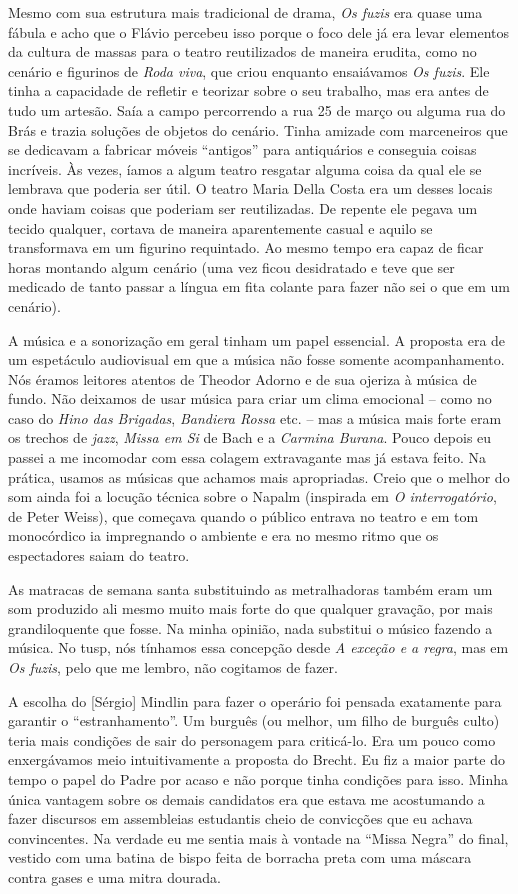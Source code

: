 Mesmo com sua estrutura mais tradicional de drama, {\it Os fuzis} era
quase uma fábula e acho que o Flávio percebeu isso porque o foco dele já
era levar elementos da cultura de massas para o teatro reutilizados de
maneira erudita, como no cenário e figurinos de {\it Roda viva}, que
criou enquanto ensaiávamos {\it Os fuzis}. Ele tinha a capacidade de
refletir e teorizar sobre o seu trabalho, mas era antes de tudo um
artesão. Saía a campo percorrendo a rua 25 de março ou alguma rua do
Brás e trazia soluções de objetos do cenário. Tinha amizade com
marceneiros que se dedicavam a fabricar móveis “antigos” para
antiquários e conseguia coisas incríveis. Às vezes, íamos a algum teatro
resgatar alguma coisa da qual ele se lembrava que poderia ser útil. O
teatro Maria Della Costa era um desses locais onde haviam coisas que
poderiam ser reutilizadas. De repente ele pegava um tecido qualquer,
cortava de maneira aparentemente casual e aquilo se transformava em um
figurino requintado. Ao mesmo tempo era capaz de ficar horas montando
algum cenário (uma vez ficou desidratado e teve que ser medicado de
tanto passar a língua em fita colante para fazer não sei o que em um
cenário).

A música e a sonorização em geral tinham um papel essencial. A proposta
era de um espetáculo audiovisual em que a música não fosse somente
acompanhamento. Nós éramos leitores atentos de Theodor Adorno e de sua
ojeriza à música de fundo. Não deixamos de usar música para criar um
clima emocional -- como no caso do {\it Hino das Brigadas},
{\it Bandiera Rossa} etc. -- mas a música mais forte eram os trechos de
{\it jazz}, {\it Missa em Si} de Bach e a {\it Carmina Burana}. Pouco
depois eu passei a me incomodar com essa colagem extravagante mas já
estava feito. Na prática, usamos as músicas que achamos mais
apropriadas. Creio que o melhor do som ainda foi a locução técnica sobre
o Napalm (inspirada em {\it O interrogatório}, de Peter Weiss), que
começava quando o público entrava no teatro e em tom monocórdico ia
impregnando o ambiente e era no mesmo ritmo que os espectadores saiam do
teatro.

As matracas de semana santa substituindo as metralhadoras também eram um
som produzido ali mesmo muito mais forte do que qualquer gravação, por
mais grandiloquente que fosse. Na minha opinião, nada substitui o músico
fazendo a música. No {\sc tusp}, nós tínhamos essa concepção desde {\it A
exceção e a regra}, mas em {\it Os fuzis}, pelo que me lembro, não
cogitamos de fazer.

A escolha do {[}Sérgio{]} Mindlin para fazer o operário foi pensada
exatamente para garantir o “estranhamento”. Um burguês (ou melhor, um
filho de burguês culto) teria mais condições de sair do personagem para
criticá-lo. Era um pouco como enxergávamos meio intuitivamente a
proposta do Brecht. Eu fiz a maior parte do tempo o papel do Padre por
acaso e não porque tinha condições para isso. Minha única vantagem sobre
os demais candidatos era que estava me acostumando a fazer discursos em
assembleias estudantis cheio de convicções que eu achava convincentes.
Na verdade eu me sentia mais à vontade na “Missa Negra” do final,
vestido com uma batina de bispo feita de borracha preta com uma máscara
contra gases e uma mitra dourada.

